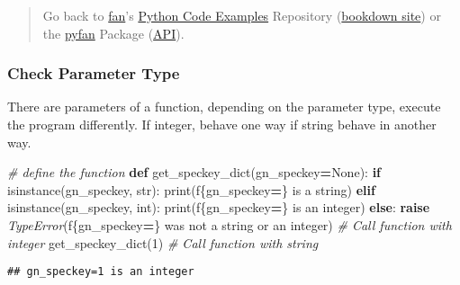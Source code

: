 \documentclass[
]{book}
\newenvironment{Shaded}{\begin{snugshade}}{\end{snugshade}}
\newcommand{\BuiltInTok}[1]{#1}
\newcommand{\CommentTok}[1]{\textcolor[rgb]{0.56,0.35,0.01}{\textit{#1}}}
\newcommand{\ControlFlowTok}[1]{\textcolor[rgb]{0.13,0.29,0.53}{\textbf{#1}}}
\newcommand{\DecValTok}[1]{\textcolor[rgb]{0.00,0.00,0.81}{#1}}
\newcommand{\KeywordTok}[1]{\textcolor[rgb]{0.13,0.29,0.53}{\textbf{#1}}}
\newcommand{\NormalTok}[1]{#1}
\newcommand{\OperatorTok}[1]{\textcolor[rgb]{0.81,0.36,0.00}{\textbf{#1}}}
\newcommand{\PreprocessorTok}[1]{\textcolor[rgb]{0.56,0.35,0.01}{\textit{#1}}}
\newcommand{\SpecialCharTok}[1]{\textcolor[rgb]{0.00,0.00,0.00}{#1}}
\newcommand{\SpecialStringTok}[1]{\textcolor[rgb]{0.31,0.60,0.02}{#1}}
\newcommand{\VariableTok}[1]{\textcolor[rgb]{0.00,0.00,0.00}{#1}}
\begin{document}
\begin{quote}
Go back to \href{http://fanwangecon.github.io/}{fan}'s \href{https://fanwangecon.github.io/Py4Econ/}{Python Code Examples} Repository (\href{https://fanwangecon.github.io/Py4Econ/bookdown}{bookdown site}) or the \href{https://pyfan.readthedocs.io/en/latest/}{pyfan} Package (\href{https://pyfan.readthedocs.io/en/latest/reference.html}{API}).
\end{quote}

\hypertarget{check-parameter-type}{%
\subsubsection{Check Parameter Type}\label{check-parameter-type}}

There are parameters of a function, depending on the parameter type, execute the program differently. If integer, behave one way if string behave in another way.

\begin{Shaded}
\begin{Highlighting}[]
\CommentTok{\# define the function}
\KeywordTok{def}\NormalTok{ get\_speckey\_dict(gn\_speckey}\OperatorTok{=}\VariableTok{None}\NormalTok{):}
    \ControlFlowTok{if} \BuiltInTok{isinstance}\NormalTok{(gn\_speckey, }\BuiltInTok{str}\NormalTok{):}
        \BuiltInTok{print}\NormalTok{(}\SpecialStringTok{f\textquotesingle{}}\SpecialCharTok{\{}\NormalTok{gn\_speckey}\OperatorTok{=}\SpecialCharTok{\}}\SpecialStringTok{ is a string\textquotesingle{}}\NormalTok{)}
    \ControlFlowTok{elif} \BuiltInTok{isinstance}\NormalTok{(gn\_speckey, }\BuiltInTok{int}\NormalTok{):}
        \BuiltInTok{print}\NormalTok{(}\SpecialStringTok{f\textquotesingle{}}\SpecialCharTok{\{}\NormalTok{gn\_speckey}\OperatorTok{=}\SpecialCharTok{\}}\SpecialStringTok{ is an integer\textquotesingle{}}\NormalTok{)}
    \ControlFlowTok{else}\NormalTok{:}
        \ControlFlowTok{raise} \PreprocessorTok{TypeError}\NormalTok{(}\SpecialStringTok{f\textquotesingle{}}\SpecialCharTok{\{}\NormalTok{gn\_speckey}\OperatorTok{=}\SpecialCharTok{\}}\SpecialStringTok{ was not a string or an integer\textquotesingle{}}\NormalTok{)}
\CommentTok{\# Call function with integer}
\NormalTok{get\_speckey\_dict(}\DecValTok{1}\NormalTok{)}
\CommentTok{\# Call function with string}
\end{Highlighting}
\end{Shaded}

\begin{verbatim}
## gn_speckey=1 is an integer
\end{verbatim}
\end{document}

